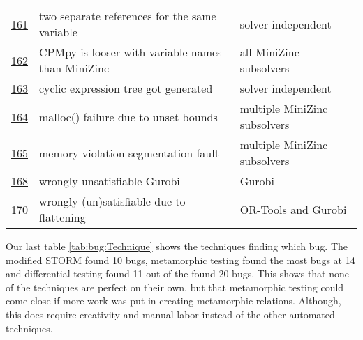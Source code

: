 \begin{table}[]
\begin{tabular}{lll}
		\href{https://github.com/CPMpy/cpmpy/issues/161}{161} & two separate references for the same variable     & solver independent           \\
		\href{https://github.com/CPMpy/cpmpy/issues/162}{162} & CPMpy is looser with variable names than MiniZinc & all MiniZinc subsolvers      \\
		\href{https://github.com/CPMpy/cpmpy/issues/163}{163} & cyclic expression tree got generated               & solver independent           \\
		\href{https://github.com/CPMpy/cpmpy/issues/164}{164} & malloc() failure due to unset bounds              & multiple MiniZinc subsolvers \\
		\href{https://github.com/CPMpy/cpmpy/issues/165}{165} & memory violation segmentation fault               & multiple MiniZinc subsolvers \\
		\href{https://github.com/CPMpy/cpmpy/issues/168}{168} & wrongly unsatisfiable Gurobi                      & Gurobi                       \\
		\href{https://github.com/CPMpy/cpmpy/issues/170}{170} & wrongly (un)satisfiable due to flattening         & OR-Tools and Gurobi          \\ \bottomrule
	\end{tabular}
\end{table}

Our last table \ref{tab:bug:Technique} shows the techniques finding which bug. The modified STORM found 10 bugs, metamorphic testing found the most bugs at 14 and differential testing found 11 out of the found 20 bugs. This shows that none of the techniques are perfect on their own, but that metamorphic testing could come close if more work was put in creating metamorphic relations. Although, this does require creativity and manual labor instead of the other automated techniques.

